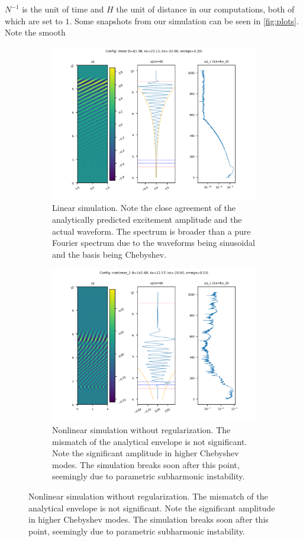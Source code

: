 \documentclass[11pt,
        usenames, %
        dvipsnames %
    ]{article}
\begin{document}
$N^{-1}$ is the unit of time and $H$ the unit of distance in our computations,
both of which are set to $1$. Some snapshots from our simulation can be seen in
\autoref{fig:plots}. Note the smooth
\begin{figure}[t]
    \centering
    \begin{subfigure}{0.47\textwidth}
        \centering
        \includegraphics[width=\textwidth]{figs/linear.png}
        \caption{Linear simulation. Note the close agreement of the analytically
        predicted excitement amplitude and the actual waveform. The spectrum is
        broader than a pure Fourier spectrum due to the waveforms being
        sinusoidal and the basis being Chebyshev.}
    \end{subfigure}\hfill
    \begin{subfigure}{0.47\textwidth}
        \centering
        \includegraphics[width=\textwidth]{figs/nonlin_psi.png}
        \caption{Nonlinear simulation without regularization. The mismatch of
        the analytical envelope is not significant. Note the significant
        amplitude in higher Chebyshev modes. The simulation breaks soon after
        this point, seemingly due to parametric subharmonic instability.}
    \end{subfigure}


\end{figure}
\end{document}
